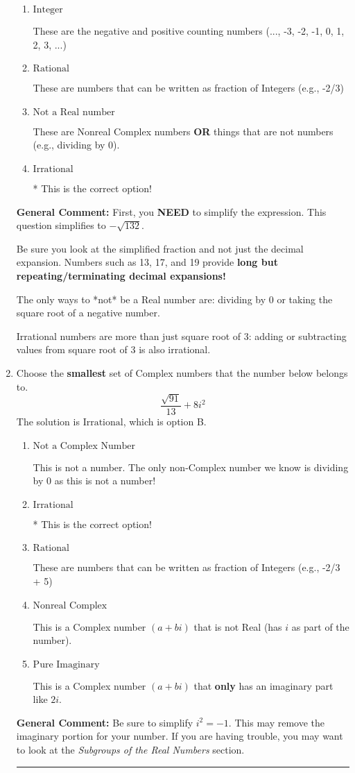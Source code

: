 \documentclass{extbook}[14pt]
\newcommand{\litem}[1]{\item #1

\rule{\textwidth}{0.4pt}}
\begin{document}
\begin{enumerate}
{\begin{enumerate}[label=\Alph*.]
These are the counting numbers with 0 (0, 1, 2, 3, ...)
\item \( \text{Integer} \)

These are the negative and positive counting numbers (..., -3, -2, -1, 0, 1, 2, 3, ...)
\item \( \text{Rational} \)

These are numbers that can be written as fraction of Integers (e.g., -2/3)
\item \( \text{Not a Real number} \)

These are Nonreal Complex numbers \textbf{OR} things that are not numbers (e.g., dividing by 0).
\item \( \text{Irrational} \)

* This is the correct option!
\end{enumerate}

\textbf{General Comment:} First, you \textbf{NEED} to simplify the expression. This question simplifies to $-\sqrt{132}$. 
 
 Be sure you look at the simplified fraction and not just the decimal expansion. Numbers such as 13, 17, and 19 provide \textbf{long but repeating/terminating decimal expansions!} 
 
 The only ways to *not* be a Real number are: dividing by 0 or taking the square root of a negative number. 
 
 Irrational numbers are more than just square root of 3: adding or subtracting values from square root of 3 is also irrational.
}
\litem{
Choose the \textbf{smallest} set of Complex numbers that the number below belongs to.
\[ \frac{\sqrt{91}}{13}+8i^2 \]The solution is \( \text{Irrational} \), which is option B.\begin{enumerate}[label=\Alph*.]
\item \( \text{Not a Complex Number} \)

This is not a number. The only non-Complex number we know is dividing by 0 as this is not a number!
\item \( \text{Irrational} \)

* This is the correct option!
\item \( \text{Rational} \)

These are numbers that can be written as fraction of Integers (e.g., -2/3 + 5)
\item \( \text{Nonreal Complex} \)

This is a Complex number $(a+bi)$ that is not Real (has $i$ as part of the number).
\item \( \text{Pure Imaginary} \)

This is a Complex number $(a+bi)$ that \textbf{only} has an imaginary part like $2i$.
\end{enumerate}

\textbf{General Comment:} Be sure to simplify $i^2 = -1$. This may remove the imaginary portion for your number. If you are having trouble, you may want to look at the \textit{Subgroups of the Real Numbers} section.
}
\end{enumerate}
\end{document}
